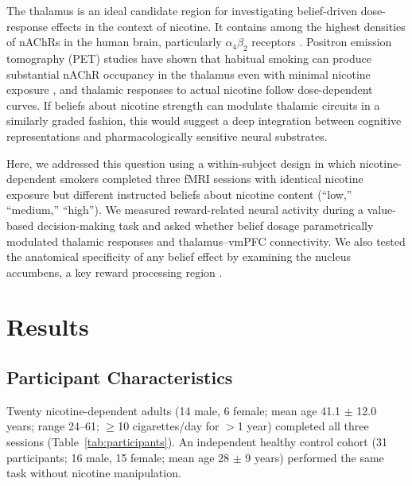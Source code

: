 \documentclass[11pt]{article}
\begin{document}
The thalamus is an ideal candidate region for investigating belief-driven dose-response effects in the context of nicotine. It contains among the highest densities of nAChRs in the human brain, particularly $\alpha_4\beta_2$ receptors \citep{brody2006, picciotto2012}. Positron emission tomography (PET) studies have shown that habitual smoking can produce substantial nAChR occupancy in the thalamus even with minimal nicotine exposure \citep{brody2006}, and thalamic responses to actual nicotine follow dose-dependent curves. If beliefs about nicotine strength can modulate thalamic circuits in a similarly graded fashion, this would suggest a deep integration between cognitive representations and pharmacologically sensitive neural substrates.

Here, we addressed this question using a within-subject design in which nicotine-dependent smokers completed three fMRI sessions with identical nicotine exposure but different instructed beliefs about nicotine content (``low,'' ``medium,'' ``high''). We measured reward-related neural activity during a value-based decision-making task \citep{bartra2013} and asked whether belief dosage parametrically modulated thalamic responses and thalamus--vmPFC connectivity. We also tested the anatomical specificity of any belief effect by examining the nucleus accumbens, a key reward processing region \citep{haber2006}.

\section{Results}

\subsection{Participant Characteristics}

Twenty nicotine-dependent adults (14 male, 6 female; mean age 41.1 $\pm$ 12.0 years; range 24--61; $\geq$10 cigarettes/day for $>$1 year) completed all three sessions (Table~\ref{tab:participants}). An independent healthy control cohort (31 participants; 16 male, 15 female; mean age 28 $\pm$ 9 years) performed the same task without nicotine manipulation.
\end{document}
